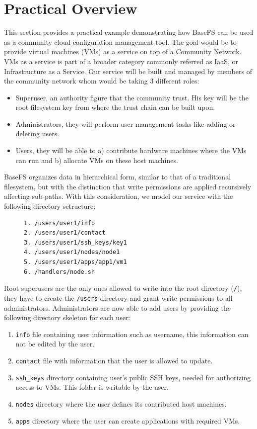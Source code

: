 \documentclass{sig-alternate}
\begin{document}
\section{Practical Overview} \label{example}

This section provides a practical example demonstrating how BaseFS can be used as a community cloud configuration management tool. The goal would be to provide virtual machines (VMs) as a service on top of a Community Network. VMs as a service is part of a broader category commonly referred as IaaS, or Infrastructure as a Service. Our service will be built and managed by members of the community network whom would be taking 3 different roles:

\begin{itemize}
 \item Superuser, an authority figure that the community trust. His key will be the root filesystem key from where the trust chain can be built upon.
 \item Administrators, they will perform user management tasks like adding or deleting users.
 \item Users, they will be able to a) contribute hardware machines where the VMs can run and b) allocate VMs on these host machines.
\end{itemize}

BaseFS organizes data in hierarchical form, similar to that of a traditional filesystem, but with the distinction that write permissions are applied recursively affecting sub-paths. With this consideration, we model our service with the following directory sctructure:

\begin{figure}[H]
\centering
\begin{BVerbatim}
1. /users/user1/info
2. /users/user1/contact
3. /users/user1/ssh_keys/key1
4. /users/user1/nodes/node1
5. /users/user1/apps/app1/vm1
6. /handlers/node.sh
\end{BVerbatim}
\end{figure}


Root superusers are the only ones allowed to write into the root directory (\texttt{/}), they have to create the \texttt{/users} directory and grant write permissions to all administrators. Administrators are now able to add users by providing the following directory skeleton for each user:

\begin{enumerate}
 \item \texttt{info} file containing user information such as username, this information can not be edited by the user.
 \item \texttt{contact} file with information that the user is allowed to update.
 \item \texttt{ssh\_keys} directory containing user's public SSH keys, needed for authorizing access to VMs. This folder is writable by the user.
 \item \texttt{nodes} directory where the user defines its contributed host machines.
 \item \texttt{apps} directory where the user can create applications with required VMs.
\end{enumerate}
\end{document}
